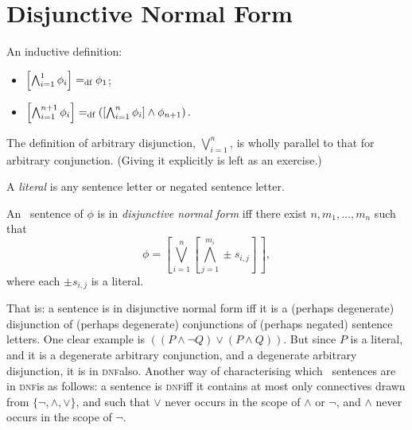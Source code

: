 

\section{Disjunctive Normal Form}

\begin{definition} An inductive definition: \begin{itemize}
	\item $\left[\bigwedge_{i=1}^{1} \phi_{i}\right] =_{\text{df}} \phi_{1}$;
	 \item $\left[\bigwedge_{i=1}^{n+1}\phi_{i}\right]=_{\text{df}} \left(\left[\bigwedge_{i=1}^{n} \phi_{i}\right]\wedge \phi_{n+1}\right).$
\end{itemize} 
\end{definition} The definition of arbitrary disjunction, $\bigvee_{i=1}^{n}$, is wholly parallel to that for arbitrary conjunction. (Giving it explicitly is left as an exercise.) \begin{definition}[Literal]
	A \emph{literal} is any sentence letter or negated sentence letter. 
\end{definition}
\begin{definition}
	An \lone\ sentence of $\phi$ is in \emph{disjunctive normal form} iff there exist $n,m_{1},\ldots,m_{n}$ such that\[\phi = \left[\bigvee_{i=1}^{n}\left[\bigwedge_{j=1}^{m_{i}} \pm s_{i,j}\right]\,\right],\]where each $\pm s_{i,j}$ is a literal.
\end{definition} That is: a sentence is in disjunctive normal form iff it is a (perhaps degenerate) disjunction of (perhaps degenerate) conjunctions of (perhaps negated) sentence letters. One clear example is $((P\wedge \neg Q) \vee (P \wedge Q))$. But since $P$ is a literal, and it is a degenerate arbitrary conjunction, and a degenerate arbitrary disjunction, it is in \textsc{\lowercase{DNF}}also. Another way of characterising which \lone\ sentences are in \textsc{\lowercase{DNF}}is as follows: a sentence is \textsc{\lowercase{DNF}}iff it contains at most only connectives drawn from $\{\neg,\wedge,\vee\}$, and such that $\vee$ never occurs in the scope of $\wedge$ or $\neg$, and $\wedge$ never occurs in the scope of $\neg$.


